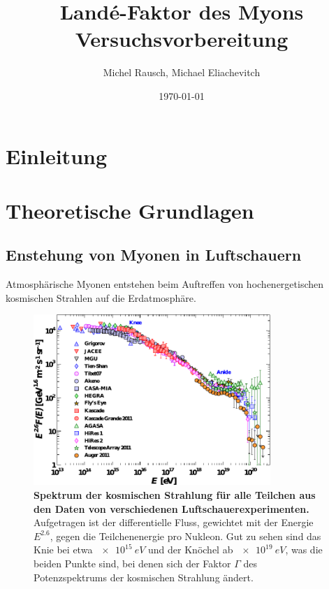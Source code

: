 \documentclass[a4paper,ngerman]{scrartcl}
\title{Landé-Faktor des Myons\\Versuchsvorbereitung}
\date{\today}
\author{Michel Rausch, Michael Eliachevitch}
\begin{document}
\maketitle
\tableofcontents
\newpage

\section{Einleitung}
\label{sec:einfuhrung}


\section{Theoretische Grundlagen}
\label{sec:theorie}

\subsection{Enstehung von Myonen in Luftschauern}
\label{sec:luftschauer}

Atmosphärische Myonen entstehen beim Auftreffen von hochenergetischen kosmischen Strahlen auf die Erdatmosphäre.


\begin{figure}[tbh!]
  \centering
  \includegraphics[width=0.8\textwidth]{abbildungen/cr_spectrum_pdg11.pdf}
  \caption{\textbf{Spektrum der kosmischen Strahlung für alle Teilchen aus den Daten von verschiedenen Luftschauerexperimenten.} Aufgetragen ist der differentielle Fluss, gewichtet mit der Energie $E^{2.6}$, gegen die Teilchenenergie pro Nukleon. Gut zu sehen sind das Knie bei etwa $\SI{e15}{eV}$ und der Knöchel ab $\SI{e19}{eV}$, was die beiden Punkte sind, bei denen sich der Faktor $\Gamma$ des Potenzspektrums der kosmischen Strahlung ändert.}
  \label{fig:cr_spectrum}
\end{figure}
\end{document}
